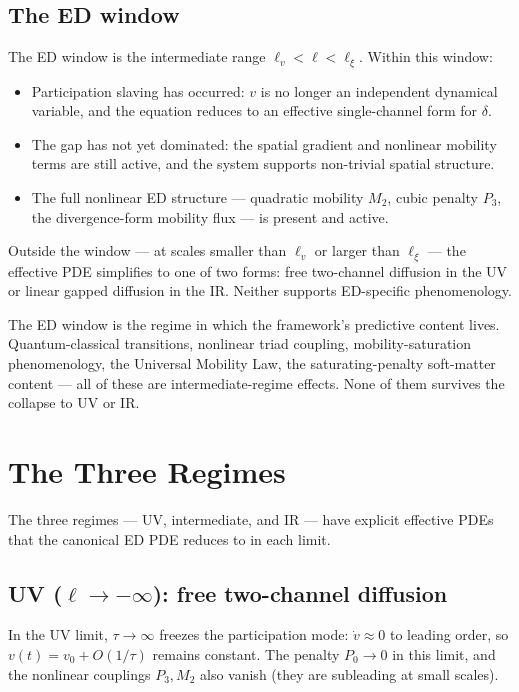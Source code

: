 \documentclass[11pt,a4paper]{article}
\begin{document}
\subsection{The ED window}

The ED window is the intermediate range $\ell_v < \ell < \ell_\xi$. Within this window:

\begin{itemize}[noitemsep]
\item Participation slaving has occurred: $v$ is no longer an independent dynamical variable, and the equation reduces to an effective single-channel form for $\delta$.
\item The gap has not yet dominated: the spatial gradient and nonlinear mobility terms are still active, and the system supports non-trivial spatial structure.
\item The full nonlinear ED structure --- quadratic mobility $M_2$, cubic penalty $P_3$, the divergence-form mobility flux --- is present and active.
\end{itemize}

Outside the window --- at scales smaller than $\ell_v$ or larger than $\ell_\xi$ --- the effective PDE simplifies to one of two forms: free two-channel diffusion in the UV or linear gapped diffusion in the IR. Neither supports ED-specific phenomenology.

The ED window is the regime in which the framework's predictive content lives. Quantum-classical transitions, nonlinear triad coupling, mobility-saturation phenomenology, the Universal Mobility Law, the saturating-penalty soft-matter content --- all of these are intermediate-regime effects. None of them survives the collapse to UV or IR.

\section{The Three Regimes}

The three regimes --- UV, intermediate, and IR --- have explicit effective PDEs that the canonical ED PDE reduces to in each limit.

\subsection{UV ($\ell \to -\infty$): free two-channel diffusion}

In the UV limit, $\tau \to \infty$ freezes the participation mode: $\dot{v} \approx 0$ to leading order, so $v(t) = v_0 + O(1/\tau)$ remains constant. The penalty $P_0 \to 0$ in this limit, and the nonlinear couplings $P_3, M_2$ also vanish (they are subleading at small scales).
\end{document}
